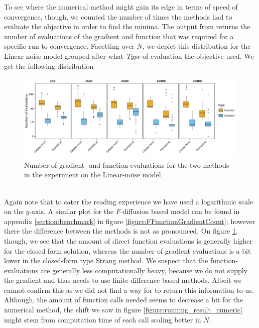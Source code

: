 To see where the numerical method might gain its edge in terms of speed of convergence, though, we counted the number of times the methods had to evaluate the objective in order to find the minima. The  output from  returns the number of evaluations of the gradient and function that was required for a specific run to convergence. Facetting over $N$, we depict this distribution for the Linear noise model grouped after what \textit{Type} of evaluation the objective used. We get the following distribution
\begin{figure}[h!]
    \begin{center}
    \includegraphics[scale = .08]{figures/function_gradient_count_Linear_plot.jpeg}     
    \caption{Number of gradient- and function evaluations for the two methods in the experiment on the Linear-noise model}
    \label{figure:linearFunctionGradientCount}   
    \end{center}
\end{figure}\\
Again note that to cater the reading experience we have used a logarithmic scale on the $y$-axis. A similar plot for the $F$-diffusion based model can be found in appendix \ref{section:benchmark} in figure \ref{figure:FFunctionGradientCount}; however there the difference between the methods is not as pronounced. On figure \ref{figure:linearFunctionGradientCount}, though, we see that the amount of direct function evaluations is generally higher for the closed form solution, whereas the number of gradient evaluations is a bit lower in the closed-form type Strang method. We suspect that the function-evaluations are generally less computationally heavy, because we do not supply the gradient and  thus needs to use finite-difference based methods. Albeit we cannot confirm this as we did not find a way for  to return this information to us. Although, the amount of function calls needed seems to decrease a bit for the numerical method, the shift we saw in figure \ref{figure:running_result_numeric} might stem from computation time of each call scaling better in $N$.


